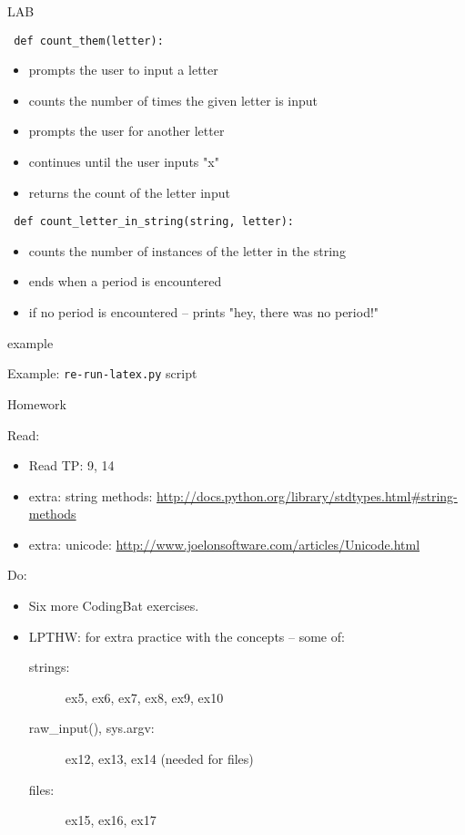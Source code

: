 \documentclass{beamer}
\begin{document}
\begin{frame}[fragile]{LAB}

\verb| def count_them(letter): |
\begin{itemize}
  \item prompts the user to input a letter
  \item counts the number of times the given letter is input
  \item prompts the user for another letter
  \item continues until the user inputs "x"
  \item returns the count of the letter input
\end{itemize}

\verb| def count_letter_in_string(string, letter): |
\begin{itemize}
  \item counts the number of instances of the letter in the string
  \item ends when a period is encountered
  \item if no period is encountered -- prints "hey, there was no period!"
\end{itemize}
\end{frame}

\begin{frame}[fragile]{example}

\Large{Example: \verb|re-run-latex.py| script}

\end{frame}


\begin{frame}[fragile]{Homework}

Read:
\begin{itemize}
  \item Read TP: 9, 14
  \item extra: string methods: \url{http://docs.python.org/library/stdtypes.html#string-methods}
  \item extra: unicode: \url{http://www.joelonsoftware.com/articles/Unicode.html}
\end{itemize}

Do:
\begin{itemize}
    \item Six more CodingBat exercises. 
    \item LPTHW: for extra practice with the concepts -- some of:
    \begin{description}
        \item[strings:] ex5, ex6, ex7, ex8, ex9, ex10
        \item[raw\_input(), sys.argv:] ex12, ex13, ex14 (needed for files)
        \item[files:] ex15, ex16, ex17 
    \end{description}    
\end{itemize}

\end{frame}
\end{document}
